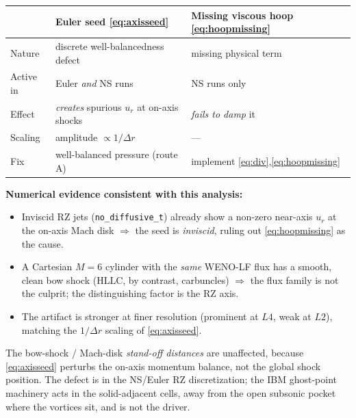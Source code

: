 \documentclass[11pt]{article}
\newcommand{\ur}{u_r}
\newcommand{\code}[1]{\texttt{\small #1}}
\begin{document}
\begin{table}[h]
\centering
\begin{tabular}{@{}lll@{}}
\toprule
 & \textbf{Euler seed \eqref{eq:axisseed}} & \textbf{Missing viscous hoop \eqref{eq:hoopmissing}}\\
\midrule
Nature & discrete well-balancedness defect & missing physical term \\
Active in & Euler \emph{and} NS runs & NS runs only \\
Effect & \emph{creates} spurious $\ur$ at on-axis shocks & \emph{fails to damp} it \\
Scaling & amplitude $\propto 1/\Delta r$ & --- \\
Fix & well-balanced pressure (route A) & implement \eqref{eq:div},\eqref{eq:hoopmissing} \\
\bottomrule
\end{tabular}
\end{table}

\noindent\textbf{Numerical evidence consistent with this analysis:}
\begin{itemize}[leftmargin=1.6em,itemsep=1pt]
\item Inviscid RZ jets (\code{no\_diffusive\_t}) already show a non-zero
      near-axis $\ur$ at the on-axis Mach disk $\Rightarrow$ the seed is
      \emph{inviscid}, ruling out \eqref{eq:hoopmissing} as the cause.
\item A Cartesian $M{=}6$ cylinder with the \emph{same} WENO-LF flux has a
      smooth, clean bow shock (HLLC, by contrast, carbuncles) $\Rightarrow$
      the flux family is not the culprit; the distinguishing factor is the
      RZ axis.
\item The artifact is stronger at finer resolution (prominent at $L4$,
      weak at $L2$), matching the $1/\Delta r$ scaling of
      \eqref{eq:axisseed}.
\end{itemize}
The bow-shock / Mach-disk \emph{stand-off distances} are unaffected,
because \eqref{eq:axisseed} perturbs the on-axis momentum balance, not the
global shock position.  The defect is in the NS/Euler RZ discretization;
the IBM ghost-point machinery acts in the solid-adjacent cells, away from
the open subsonic pocket where the vortices sit, and is not the driver.
\end{document}
